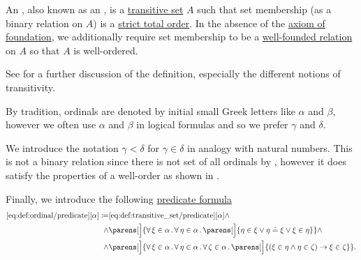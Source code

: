\begin{definition}\label{def:ordinal}
  An , also known as an , is a \hyperref[def:transitive_set]{transitive set} \( A \) such that set membership (as a binary relation on \( A \)) is a \hyperref[def:totally_ordered_set]{strict total order}. In the absence of the \hyperref[def:zfc/foundation]{axiom of foundation}, we additionally require set membership to be a \hyperref[def:well_founded_relation]{well-founded relation} on \( A \) so that \( A \) is well-ordered.

  See  for a further discussion of the definition, especially the different notions of transitivity.

  By tradition, ordinals are denoted by initial small Greek letters like \( \alpha \) and \( \beta \), however we often use \( \alpha \) and \( \beta \) in logical formulas and so we prefer \( \gamma \) and \( \delta \).

  We introduce the notation \( \gamma < \delta \) for \( \gamma \in \delta \) in analogy with natural numbers. This is not a binary relation since there is not set of all ordinals by , however it does satisfy the properties of a well-order as shown in .

  Finally, we introduce the following \hyperref[rem:predicate_formula]{predicate formula}
  \begin{equation*}\taglabel[\op{IsOrdinal}]{eq:def:ordinal/predicate}
    \begin{aligned}
      \ref{eq:def:ordinal/predicate}[\alpha] \coloneqq
        &\ref{eq:def:transitive_set/predicate}[\alpha]
        \wedge \\ \wedge&
        \parens[\Big]
        {
          \qforall {\xi \in \alpha}
          \qforall {\eta \in \alpha}
          \parens[\Big]
            {
              \eta \in \xi \vee \eta \doteq \xi \vee \xi \in \eta
            }
        }
        \wedge \\ \wedge&
        \parens[\Big]
        {
          \qforall {\xi \in \alpha}
          \qforall {\eta \in \alpha}
          \qforall {\zeta \in \alpha}
          \parens[\Big]
          {
            (\xi \in \eta \wedge \eta \in \zeta) \rightarrow \xi \in \zeta
          }
        }.
    \end{aligned}
  \end{equation*}
\end{definition}

